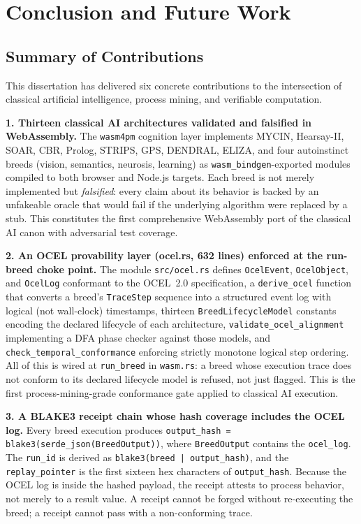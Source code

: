 \chapter{Conclusion and Future Work}
\label{chap:conclusion}

\section{Summary of Contributions}
\label{sec:contributions}

This dissertation has delivered six concrete contributions to the intersection of classical artificial intelligence, process mining, and verifiable computation.

\textbf{1. Thirteen classical AI architectures validated and falsified in WebAssembly.}
The \texttt{wasm4pm} cognition layer implements MYCIN, Hearsay-II, SOAR, CBR, Prolog, STRIPS, GPS, DENDRAL, ELIZA, and four autoinstinct breeds (vision, semantics, neurosis, learning) as \texttt{wasm\_bindgen}-exported modules compiled to both browser and Node.js targets. Each breed is not merely implemented but \emph{falsified}: every claim about its behavior is backed by an unfakeable oracle that would fail if the underlying algorithm were replaced by a stub. This constitutes the first comprehensive WebAssembly port of the classical AI canon with adversarial test coverage.

\textbf{2. An OCEL provability layer (ocel.rs, 632 lines) enforced at the run-breed choke point.}
The module \texttt{src/ocel.rs} defines \texttt{OcelEvent}, \texttt{OcelObject}, and \texttt{OcelLog} conformant to the OCEL~2.0 specification, a \texttt{derive\_ocel} function that converts a breed's \texttt{TraceStep} sequence into a structured event log with logical (not wall-clock) timestamps, thirteen \texttt{BreedLifecycleModel} constants encoding the declared lifecycle of each architecture, \texttt{validate\_ocel\_alignment} implementing a DFA phase checker against those models, and \texttt{check\_temporal\_conformance} enforcing strictly monotone logical step ordering. All of this is wired at \texttt{run\_breed} in \texttt{wasm.rs}: a breed whose execution trace does not conform to its declared lifecycle model is refused, not just flagged. This is the first process-mining-grade conformance gate applied to classical AI execution.

\textbf{3. A BLAKE3 receipt chain whose hash coverage includes the OCEL log.}
Every breed execution produces \texttt{output\_hash = blake3(serde\_json(BreedOutput))}, where \texttt{BreedOutput} contains the \texttt{ocel\_log}. The \texttt{run\_id} is derived as \texttt{blake3(breed\,|\,output\_hash)}, and the \texttt{replay\_pointer} is the first sixteen hex characters of \texttt{output\_hash}. Because the OCEL log is inside the hashed payload, the receipt attests to process behavior, not merely to a result value. A receipt cannot be forged without re-executing the breed; a receipt cannot pass with a non-conforming trace.

